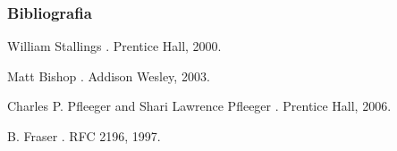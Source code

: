 \documentclass{beamer}
\begin{document}
\begin{frame}
	\frametitle{Bibliografia}
	\begin{thebibliography}{1}
	\beamertemplatebookbibitems

    William Stallings
    .
    \newblock Prentice Hall, 2000.

    Matt Bishop
    .
    \newblock Addison Wesley, 2003.

    Charles P. Pfleeger and Shari Lawrence Pfleeger
    .
    \newblock Prentice Hall, 2006.

 	\beamertemplatearticlebibitems

	B. Fraser
	.
	\newblock RFC 2196, 1997.

	\end{thebibliography}
\end{frame}
\end{document}

